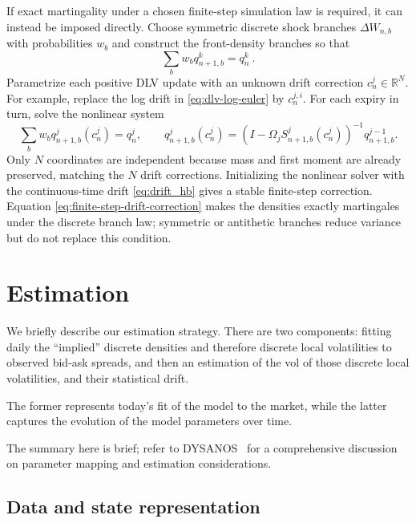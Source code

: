 \documentclass[smallextended,envcountsame,envcountsect]{svjour3}
\begin{document}
\begin{remark}
  \label{rem:discrete-branch-sampling}
  If exact martingality under a chosen finite-step simulation law is required,
  it can instead be imposed directly. Choose symmetric discrete shock branches
  $\Delta W_{n,b}$ with probabilities $w_b$ and construct the front-density
  branches so that
  \[
    \sum_b w_bq_{n+1,b}^k=q_n^k \ .
  \]
  Parametrize each positive DLV update with an unknown drift correction
  $c_n^j\in\mathbb R^N$. For example, replace the log drift in
  \eqref{eq:dlv-log-euler} by $c_n^{j,i}$. For each expiry in turn, solve the
  nonlinear system
  \begin{equation}
    \label{eq:finite-step-drift-correction}
    \sum_b w_b q_{n+1,b}^j(c_n^j)=q_n^j,
    \qquad
    q_{n+1,b}^j(c_n^j)
      =\left(I-\Omega_jS_{n+1,b}^j(c_n^j)\right)^{-1}
        q_{n+1,b}^{j-1}.
  \end{equation}
  Only $N$ coordinates are independent because mass and first moment are
  already preserved, matching the $N$ drift corrections. Initializing the
  nonlinear solver with the continuous-time drift
  \eqref{eq:drift_hb} gives
  a stable finite-step correction. Equation
  \eqref{eq:finite-step-drift-correction} makes the densities exactly
  martingales under the discrete branch law; symmetric or antithetic branches
  reduce variance but do not replace this condition.

\end{remark}

\section{Estimation}\label{sec:estimation}

We briefly describe our estimation strategy. There are two components: fitting daily the ``implied'' discrete densities and therefore discrete local volatilities
to observed bid-ask spreads, and then an estimation of the vol of those discrete local volatilities, and their statistical drift.

The former represents today's fit of the model to the market, while the latter captures the evolution of the model parameters over time.

The summary here is brief; refer
to DYSANOS~\citep{DYSANOS2026} for a comprehensive discussion on parameter mapping and estimation considerations.

\subsection{Data and state representation}
\label{sec:estimation-data}
\end{document}
